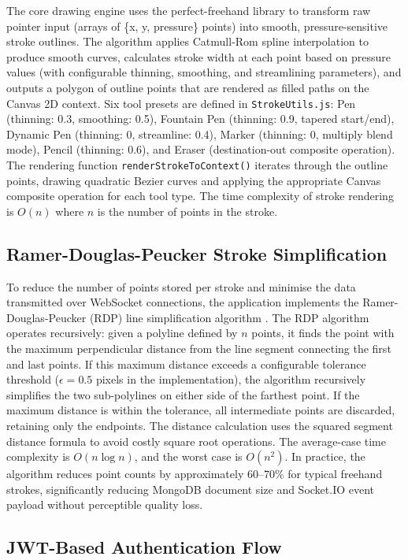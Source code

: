 \documentclass[12pt,a4paper]{report}
\begin{document}
The core drawing engine uses the perfect-freehand library to transform raw pointer input (arrays of \{x, y, pressure\} points) into smooth, pressure-sensitive stroke outlines. The algorithm applies Catmull-Rom spline interpolation to produce smooth curves, calculates stroke width at each point based on pressure values (with configurable thinning, smoothing, and streamlining parameters), and outputs a polygon of outline points that are rendered as filled paths on the Canvas 2D context. Six tool presets are defined in \texttt{StrokeUtils.js}: Pen (thinning: 0.3, smoothing: 0.5), Fountain Pen (thinning: 0.9, tapered start/end), Dynamic Pen (thinning: 0, streamline: 0.4), Marker (thinning: 0, multiply blend mode), Pencil (thinning: 0.6), and Eraser (destination-out composite operation). The rendering function \texttt{renderStrokeToContext()} iterates through the outline points, drawing quadratic Bezier curves and applying the appropriate Canvas composite operation for each tool type. The time complexity of stroke rendering is $O(n)$ where $n$ is the number of points in the stroke.

\subsection{Ramer-Douglas-Peucker Stroke Simplification}

To reduce the number of points stored per stroke and minimise the data transmitted over WebSocket connections, the application implements the Ramer-Douglas-Peucker (RDP) line simplification algorithm \cite{ref8}. The RDP algorithm operates recursively: given a polyline defined by $n$ points, it finds the point with the maximum perpendicular distance from the line segment connecting the first and last points. If this maximum distance exceeds a configurable tolerance threshold ($\epsilon = 0.5$ pixels in the implementation), the algorithm recursively simplifies the two sub-polylines on either side of the farthest point. If the maximum distance is within the tolerance, all intermediate points are discarded, retaining only the endpoints. The distance calculation uses the squared segment distance formula to avoid costly square root operations. The average-case time complexity is $O(n \log n)$, and the worst case is $O(n^2)$. In practice, the algorithm reduces point counts by approximately 60--70\% for typical freehand strokes, significantly reducing MongoDB document size and Socket.IO event payload without perceptible quality loss.

\subsection{JWT-Based Authentication Flow}
\end{document}

